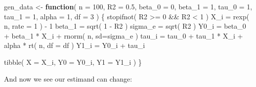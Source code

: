 \documentclass[
]{book}
\newenvironment{Shaded}{\begin{snugshade}}{\end{snugshade}}
\newcommand{\AttributeTok}[1]{\textcolor[rgb]{0.77,0.63,0.00}{#1}}
\newcommand{\ControlFlowTok}[1]{\textcolor[rgb]{0.13,0.29,0.53}{\textbf{#1}}}
\newcommand{\DecValTok}[1]{\textcolor[rgb]{0.00,0.00,0.81}{#1}}
\newcommand{\FloatTok}[1]{\textcolor[rgb]{0.00,0.00,0.81}{#1}}
\newcommand{\FunctionTok}[1]{\textcolor[rgb]{0.00,0.00,0.00}{#1}}
\newcommand{\NormalTok}[1]{#1}
\newcommand{\OtherTok}[1]{\textcolor[rgb]{0.56,0.35,0.01}{#1}}
\newcommand{\SpecialCharTok}[1]{\textcolor[rgb]{0.00,0.00,0.00}{#1}}
\begin{document}
\begin{Shaded}
\begin{Highlighting}[]
\NormalTok{gen\_data }\OtherTok{\textless{}{-}} \ControlFlowTok{function}\NormalTok{( }\AttributeTok{n =} \DecValTok{100}\NormalTok{,}
                      \AttributeTok{R2 =} \FloatTok{0.5}\NormalTok{,}
                      \AttributeTok{beta\_0 =} \DecValTok{0}\NormalTok{, }\AttributeTok{beta\_1 =} \DecValTok{1}\NormalTok{,}
                      \AttributeTok{tau\_0 =} \DecValTok{1}\NormalTok{, }\AttributeTok{tau\_1 =} \DecValTok{1}\NormalTok{, }
                      \AttributeTok{alpha =} \DecValTok{1}\NormalTok{, }\AttributeTok{df =} \DecValTok{3}\NormalTok{ ) \{}
  \FunctionTok{stopifnot}\NormalTok{( R2 }\SpecialCharTok{\textgreater{}=} \DecValTok{0} \SpecialCharTok{\&\&}\NormalTok{ R2 }\SpecialCharTok{\textless{}} \DecValTok{1}\NormalTok{ )}
\NormalTok{  X\_i }\OtherTok{=} \FunctionTok{rexp}\NormalTok{( n, }\AttributeTok{rate =} \DecValTok{1}\NormalTok{ ) }\SpecialCharTok{{-}} \DecValTok{1}
\NormalTok{  beta\_1 }\OtherTok{=} \FunctionTok{sqrt}\NormalTok{( }\DecValTok{1} \SpecialCharTok{{-}}\NormalTok{ R2 )}
\NormalTok{  sigma\_e }\OtherTok{=} \FunctionTok{sqrt}\NormalTok{( R2 )}
\NormalTok{  Y0\_i }\OtherTok{=}\NormalTok{ beta\_0 }\SpecialCharTok{+}\NormalTok{ beta\_1 }\SpecialCharTok{*}\NormalTok{ X\_i }\SpecialCharTok{+} \FunctionTok{rnorm}\NormalTok{( n, }\AttributeTok{sd=}\NormalTok{sigma\_e )}
\NormalTok{  tau\_i }\OtherTok{=}\NormalTok{ tau\_0 }\SpecialCharTok{+}\NormalTok{ tau\_1 }\SpecialCharTok{*}\NormalTok{ X\_i }\SpecialCharTok{+}\NormalTok{ alpha }\SpecialCharTok{*} \FunctionTok{rt}\NormalTok{( n, }\AttributeTok{df =}\NormalTok{ df )}
\NormalTok{  Y1\_i }\OtherTok{=}\NormalTok{ Y0\_i }\SpecialCharTok{+}\NormalTok{ tau\_i}
  
  \FunctionTok{tibble}\NormalTok{( }\AttributeTok{X =}\NormalTok{ X\_i, }\AttributeTok{Y0 =}\NormalTok{ Y0\_i, }\AttributeTok{Y1 =}\NormalTok{ Y1\_i )}
\NormalTok{\}}
\end{Highlighting}
\end{Shaded}

And now we see our estimand can change:

\begin{Shaded}
\end{Shaded}
\end{document}
